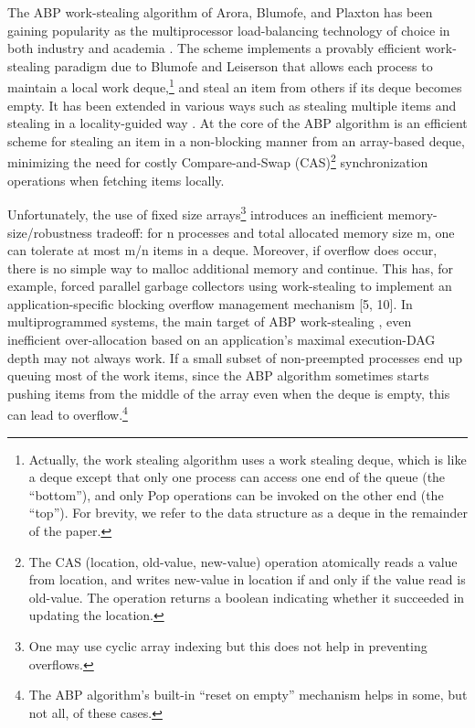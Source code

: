 The ABP work-stealing algorithm of Arora, Blumofe, and Plaxton
\cite{Arora2001} has been gaining popularity as the multiprocessor
load-balancing technology of choice in both industry and academia
\cite{Arora2001, Acar2002, Blumofe1995, Frigo1998, Danaher2005}. The
scheme implements a provably efficient work-stealing paradigm due to
Blumofe and Leiserson \cite{Blumofe1999} that allows each process to
maintain a local work deque,\footnote{Actually, the work stealing
  algorithm uses a work stealing deque, which is like a deque
  \cite{Knuth1997} except that only one process can access one end of
  the queue (the ``bottom''), and only Pop operations can be invoked
  on the other end (the ``top''). For brevity, we refer to the data
  structure as a deque in the remainder of the paper.} and steal an
item from others if its deque becomes empty. It has been extended in
various ways such as stealing multiple items \cite{Hendler2002} and
stealing in a locality-guided way \cite{Acar2002}. At the core of the
ABP algorithm is an efficient scheme for stealing an item in a
non-blocking manner from an array-based deque, minimizing the need for
costly Compare-and-Swap (CAS)\footnote{The CAS (location, old-value,
  new-value) operation atomically reads a value from location, and
  writes new-value in location if and only if the value read is
  old-value. The operation returns a boolean indicating whether it
  succeeded in updating the location.} synchronization operations when
fetching items locally.

Unfortunately, the use of fixed size arrays\footnote{One may use
  cyclic array indexing but this does not help in preventing
  overflows.} introduces an inefficient memory-size/robustness
tradeoff: for n processes and total allocated memory size m, one can
tolerate at most m/n items in a deque. Moreover, if overflow does
occur, there is no simple way to malloc additional memory and
continue. This has, for example, forced parallel garbage collectors
using work-stealing to implement an application-specific blocking
overflow management mechanism [5, 10]. In multiprogrammed systems, the
main target of ABP work-stealing \cite{Arora2001}, even inefficient
over-allocation based on an application's maximal execution-DAG depth
\cite{Arora2001, Blumofe1999} may not always work. If a small subset
of non-preempted processes end up queuing most of the work items,
since the ABP algorithm sometimes starts pushing items from the middle
of the array even when the deque is empty, this can lead to
overflow.\footnote{The ABP algorithm's built-in ``reset on empty''
  mechanism helps in some, but not all, of these cases.}

